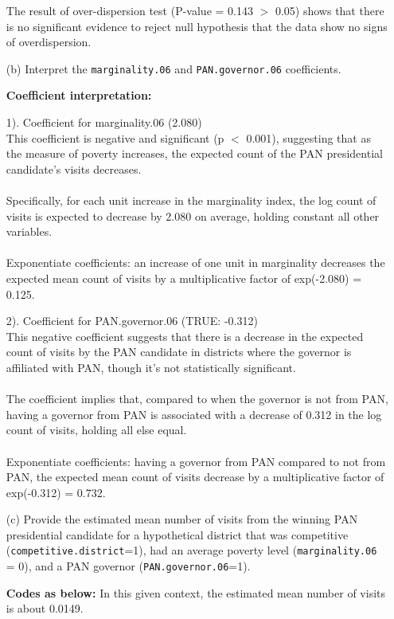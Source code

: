\documentclass[12pt,a4paper]{article}
\begin{document}
\begin{enumerate}
	\noindent The result of over-dispersion test (P-value = 0.143 $>$ 0.05) shows that there is  no significant evidence to  reject null hypothesis that the data show no signs of overdispersion.
	
	\item [(b)]
	Interpret the \texttt{marginality.06} and \texttt{PAN.governor.06} coefficients.
	
	\noindent \textbf{Coefficient interpretation:}
	
	1). Coefficient for marginality.06 (2.080)
	\\This coefficient is negative and significant (p $<$ 0.001), suggesting that as the measure of poverty  increases, the expected count of the PAN presidential candidate's visits decreases.\\ \\Specifically, for each unit increase in the marginality index, the log count of visits is expected to decrease by 2.080 on average, holding constant all other variables. \\\\Exponentiate  coefficients: an increase of one unit in marginality decreases the expected mean count of visits by a multiplicative factor of exp(-2.080) = 0.125.
	
	2). Coefficient for PAN.governor.06  (TRUE: -0.312)
	\\This negative coefficient suggests that there is a decrease in the expected count of visits by the PAN candidate in districts where the governor is affiliated with PAN, though it's not statistically significant. \\\\The coefficient implies that, compared to when the governor is not from PAN, having a governor from PAN is associated with a decrease of 0.312 in the log count of visits, holding all else equal. \\\\Exponentiate  coefficients: having a governor from PAN compared to not from PAN,  the expected mean count of visits decrease by a multiplicative factor of exp(-0.312) = 0.732.
	

	
	\item [(c)]
	Provide the estimated mean number of visits from the winning PAN presidential candidate for a hypothetical district that was competitive (\texttt{competitive.district}=1), had an average poverty level (\texttt{marginality.06} = 0), and a PAN governor (\texttt{PAN.governor.06}=1).
	
				\noindent \textbf{Codes as below:}
	\noindent In this given context, the estimated mean number of visits is about 0.0149.
	
\end{enumerate}
\end{document}
